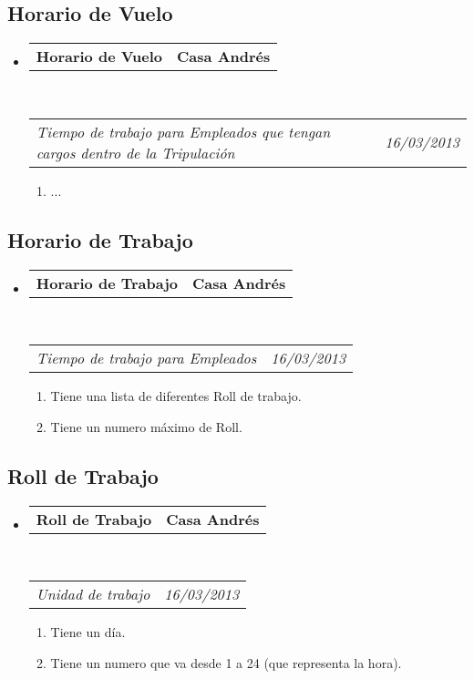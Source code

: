 \documentclass[10pt,letterpaper]{article}
\makeatletter
\newcommand{\headerrow}[2]
{\begin{tabular*}{\linewidth}{l@{\extracolsep{\fill}}r}
	#1 &
	#2 \\
\end{tabular*}}
\makeatother
\begin{document}
\subsection*{Horario de Vuelo}

\begin{itemize}
	\parskip=0.1em

	\item
	\headerrow
		{\textbf{Horario de Vuelo}}
		{\textbf{Casa Andrés}}
	\\
	\headerrow
		{\emph{Tiempo de trabajo para Empleados que tengan cargos dentro de la Tripulación}}
		{\emph{16/03/2013}}
	\begin{enumerate}
		\item ...
	\end{enumerate}

\end{itemize}

\subsection*{Horario de Trabajo}

\begin{itemize}
	\parskip=0.1em

	\item
	\headerrow
		{\textbf{Horario de Trabajo}}
		{\textbf{Casa Andrés}}
	\\
	\headerrow
		{\emph{Tiempo de trabajo para Empleados}}
		{\emph{16/03/2013}}
	\begin{enumerate}
		\item Tiene una lista de diferentes Roll de trabajo.
		\item Tiene un numero máximo de Roll.
	\end{enumerate}

\end{itemize}

\subsection*{Roll de Trabajo}

\begin{itemize}
	\parskip=0.1em

	\item
	\headerrow
		{\textbf{Roll de Trabajo}}
		{\textbf{Casa Andrés}}
	\\
	\headerrow
		{\emph{Unidad de trabajo}}
		{\emph{16/03/2013}}
	\begin{enumerate}
		\item Tiene un día.
		\item Tiene un numero que va desde 1 a 24 (que representa la hora).
	\end{enumerate}

\end{itemize}
\end{document}
